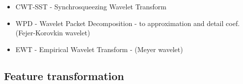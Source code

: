 \begin{itemize}
\item CWT-SST - Synchrosqueezing Wavelet Transform
	\cite{arts_fast_2022}
	\cite{yu_concentrated_2020}
	\cite{herrera_applications_2014}

\item WPD - Wavelet Packet Decomposition  - to approximation and detail coef. (Fejer-Korovkin wavelet)
	\cite{yen_wavelet_2000}
	\cite{wickmann_wavelet_2007}
	\cite{song_mfbd_2021}

\item EWT - Empirical Wavelet Transform - (Meyer wavelet)
	\cite{wang_computational_2014}
	\cite{tiwari_novel_2021}
	\cite{song_mfbd_2021}
	\cite{li_fault_2019}
	\cite{zhuang_improved_2020}
	\cite{yonggang_time_2020}
	\cite{xu_adaptive_2019}
	\cite{ni_improved_2022}
\end{itemize}


\subsection{Feature transformation}
\cite{zheng_feature_2018}

